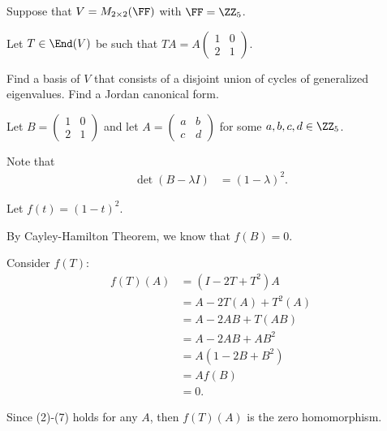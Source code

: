\documentclass[11pt]{scrartcl}
\begin{document}
\begin{problem*}
Suppose that $V = M_{2\times 2}(\FF)$ with $\FF = \ZZ_{5}$.

Let $T \in \End(V)$ be such that $TA = 
A \begin{pmatrix}
1 & 0\\
2 & 1
\end{pmatrix}$.

Find a basis of $V$ that consists of a disjoint union of cycles of generalized eigenvalues. Find a Jordan canonical form.
\end{problem*}

\begin{soln}
  \hfill

Let $B = 
\begin{pmatrix}
1 & 0\\
2 & 1
\end{pmatrix}
$ and let $A = 
\begin{pmatrix}
a & b\\
c & d
\end{pmatrix}$ for some $a, b, c, d \in \ZZ_{5}$.

Note that 
\begin{align}
\det(B-\lambda I) &= (1-\lambda)^2.
\end{align}

Let $f(t)=(1-t)^2$. 

By Cayley-Hamilton Theorem, we know that $f(B) = 0$.

Consider $f(T)$:
\begin{align}
  f(T)(A) &= (I - 2T+T^2)A\\
          &= A - 2T(A) +T^2(A)\\
          &= A - 2AB + T(AB)\\
          &= A - 2AB + AB^2\\
          &= A(1-2B+B^2)\\
          &= Af(B)\\
          &= 0.
\end{align}

Since (2)-(7) holds for any $A$, then $f(T)(A)$ is the zero homomorphism.




\end{soln}
\end{document}
